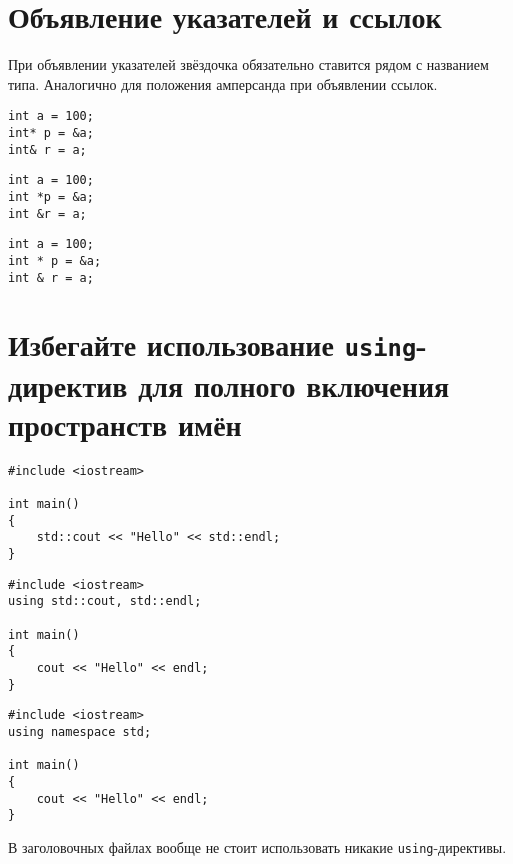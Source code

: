 \documentclass{article}
\begin{document}
\section{Объявление указателей и ссылок}
При объявлении указателей звёздочка обязательно ставится рядом с названием типа. Аналогично для положения амперсанда при объявлении ссылок.
\begin{multicols}{3}
\noindent
\begin{lstlisting}[backgroundcolor = \color{correctcolor}]
int a = 100;
int* p = &a;
int& r = a;
\end{lstlisting}
\begin{lstlisting}[backgroundcolor = \color{wrongcolor}]
int a = 100;
int *p = &a;
int &r = a;
\end{lstlisting}
\begin{lstlisting}[backgroundcolor = \color{wrongcolor}]
int a = 100;
int * p = &a;
int & r = a;
\end{lstlisting}
\end{multicols}



\section{Избегайте использование \texttt{using}-директив для полного включения пространств имён}

\begin{multicols}{3}
\noindent
\begin{lstlisting}[backgroundcolor = \color{correctcolor}]
#include <iostream>

int main()
{
    std::cout << "Hello" << std::endl;
}
\end{lstlisting}
\begin{lstlisting}[backgroundcolor = \color{correctcolor}]
#include <iostream>
using std::cout, std::endl;

int main()
{
    cout << "Hello" << endl;
}
\end{lstlisting}
\begin{lstlisting}[backgroundcolor = \color{wrongcolor}]
#include <iostream>
using namespace std;

int main()
{
    cout << "Hello" << endl;
}
\end{lstlisting}
\end{multicols}
В заголовочных файлах вообще не стоит использовать никакие \texttt{using}-директивы.
\end{document}
